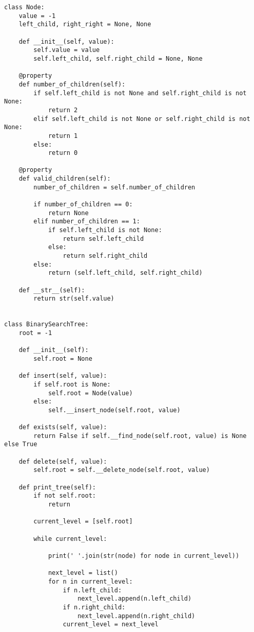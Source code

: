 \documentclass[12pt]{scrartcl}
\begin{document}
\maketitle

\begin{lstlisting}
class Node:
    value = -1
    left_child, right_right = None, None

    def __init__(self, value):
        self.value = value
        self.left_child, self.right_child = None, None

    @property
    def number_of_children(self):
        if self.left_child is not None and self.right_child is not None:
            return 2
        elif self.left_child is not None or self.right_child is not None:
            return 1
        else:
            return 0

    @property
    def valid_children(self):
        number_of_children = self.number_of_children

        if number_of_children == 0:
            return None
        elif number_of_children == 1:
            if self.left_child is not None:
                return self.left_child
            else:
                return self.right_child
        else:
            return (self.left_child, self.right_child)

    def __str__(self):
        return str(self.value)


class BinarySearchTree:
    root = -1

    def __init__(self):
        self.root = None

    def insert(self, value):
        if self.root is None:
            self.root = Node(value)
        else:
            self.__insert_node(self.root, value)

    def exists(self, value):
        return False if self.__find_node(self.root, value) is None else True

    def delete(self, value):
        self.root = self.__delete_node(self.root, value)

    def print_tree(self):
        if not self.root:
            return

        current_level = [self.root]

        while current_level:

            print(' '.join(str(node) for node in current_level))

            next_level = list()
            for n in current_level:
                if n.left_child:
                    next_level.append(n.left_child)
                if n.right_child:
                    next_level.append(n.right_child)
                current_level = next_level


\end{lstlisting}
\end{document}
